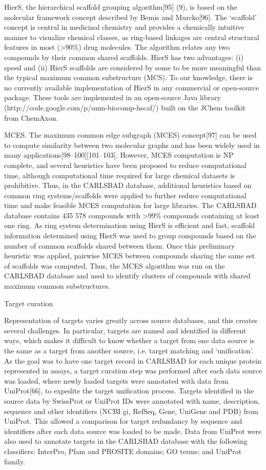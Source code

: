 HierS, the hierarchical scaffold grouping algorithm[95] (9), is based on the molecular framework concept described by Bemis and Murcko[96]. The ‘scaffold’ concept is central in medicinal chemistry and provides a chemically intuitive manner to visualize chemical classes, as ring-based linkages are central structural features in most (>90\%) drug molecules. The algorithm relates any two compounds by their common shared scaffolds. HierS has two advantages: (i) speed and (ii) HierS scaffolds are considered by some to be more meaningful than the typical maximum common substructure (MCS). To our knowledge, there is no currently available implementation of HierS in any commercial or open-source package. These tools are implemented in an open-source Java library (http://code.google.com/p/unm-biocomp-hscaf/) built on the JChem toolkit from ChemAxon.

MCES. The maximum common edge subgraph (MCES) concept[97] can be used to compute similarity between two molecular graphs and has been widely used in many applications[98–100][101–103]. However, MCES computation is NP complete, and several heuristics have been proposed to reduce computational time, although computational time required for large chemical datasets is prohibitive. Thus, in the CARLSBAD database, additional heuristics based on common ring systems/scaffolds were applied to further reduce computational time and make feasible MCES computation for large libraries. The CARLSBAD database contains 435 578 compounds with >99\% compounds containing at least one ring. As ring system determination using HierS is efficient and fast, scaffold information determined using HierS was used to group compounds based on the number of common scaffolds shared between them. Once this preliminary heuristic was applied, pairwise MCES between compounds sharing the same set of scaffolds was computed. Thus, the MCES algorithm was run on the CARLSBAD database and used to identify clusters of compounds with shared maximum common substructures.

Target curation

Representation of targets varies greatly across source databases, and this creates several challenges. In particular, targets are named and identified in different ways, which makes it difficult to know whether a target from one data source is the same as a target from another source, i.e. target matching and ‘unification’. As the goal was to have one target record in CARLSBAD for each unique protein represented in assays, a target curation step was performed after each data source was loaded, where newly loaded targets were annotated with data from UniProt[66], to expedite the target unification process. Targets identified in the source data by SwissProt or UniProt IDs were annotated with name, description, sequence and other identifiers (NCBI gi, RefSeq, Gene, UniGene and PDB) from UniProt. This allowed a comparison for target redundancy by sequence and identifiers after each data source was loaded to be made. Data from UniProt were also used to annotate targets in the CARLSBAD database with the following classifiers: InterPro, Pfam and PROSITE domains; GO terms; and UniProt family.

